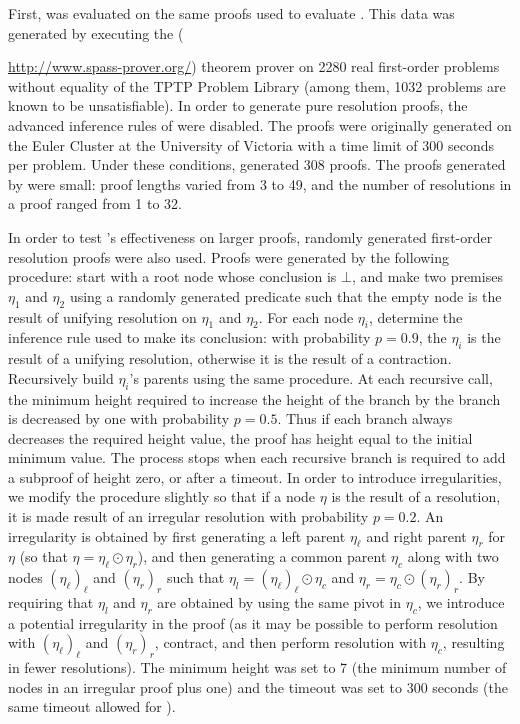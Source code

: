 First, {\FORPI} was evaluated on the same proofs used to evaluate {\GFOLU}. This data was generated by executing the {\SPASS} ({\url{http://www.spass-prover.org/}) theorem prover on 2280 real first-order problems without equality of the TPTP Problem Library (among them, 1032 problems are known to be unsatisfiable). In order to generate pure resolution proofs, the advanced inference rules of {\SPASS} were disabled. The proofs were originally generated on the Euler Cluster at the University of Victoria with a time limit of 300 seconds per problem. Under these conditions, {\SPASS} generated 308 proofs. The proofs generated by {\SPASS} were small: proof lengths varied from 3 to 49, and the number of resolutions in a proof ranged from 1 to 32.


In order to test {\FORPI}'s effectiveness on larger proofs, randomly generated first-order resolution proofs were also used.
Proofs were generated by the following procedure: start with a root node whose conclusion is $\bot$, and make two premises $\eta_1$ and $\eta_2$ using a randomly generated predicate such that the empty node is the result of unifying resolution on $\eta_1$ and $\eta_2$. For each node $\eta_i$, determine the inference rule used to make its conclusion: with probability $p=0.9$, the $\eta_i$ is the result of a unifying resolution, otherwise it is the result of a contraction. Recursively build $\eta_i$'s parents using the same procedure. At each recursive call, the minimum height required to increase the height of the branch by the branch is decreased by one with probability $p=0.5$. Thus if each branch always decreases the required height value, the proof has height equal to the initial minimum value. The process stops when each recursive branch is required to add a subproof of height zero, or after a timeout. 
In order to introduce irregularities, we modify the procedure slightly so that if a node $\eta$ is the result of a resolution, it is made result of an irregular resolution with probability $p=0.2$. An irregularity is obtained by first generating a left parent $\eta_\ell$ and right parent $\eta_r$ for $\eta$ (so that $\eta = \eta_\ell \odot \eta_r$), and then generating a common parent $\eta_c$ along with two nodes $(\eta_\ell)_\ell$ and $(\eta_r)_r$ such that $\eta_l = (\eta_\ell)_\ell \odot \eta_c$ and $\eta_r = \eta_c \odot (\eta_r)_r$. By requiring that $\eta_l$ and $\eta_r$ are obtained by using the same pivot in $\eta_c$, we introduce a potential irregularity in the proof (as it may be possible to perform resolution with $(\eta_\ell)_\ell$ and $(\eta_r)_r$, contract, and then perform resolution with $\eta_c$, resulting in fewer resolutions). The minimum height was set to 7 (the minimum number of nodes in an irregular proof plus one) and the timeout was set to 300 seconds (the same timeout allowed for {\SPASS}).


}
